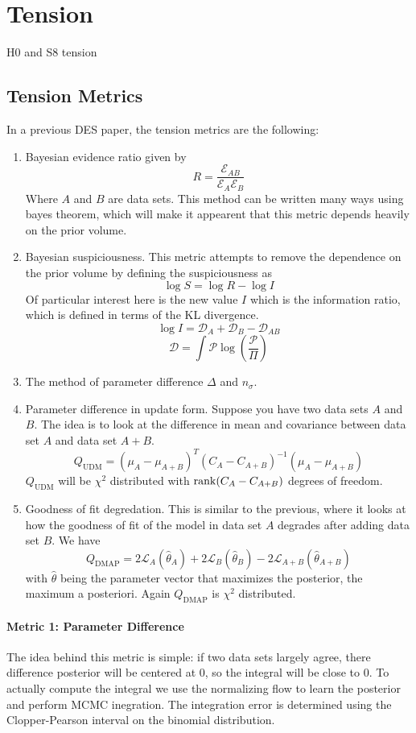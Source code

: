 \chapter{Tension}
H0 and S8 tension
\section{Tension Metrics}

In a previous DES paper, the tension metrics are the following:
\begin{enumerate}
    \item Bayesian evidence ratio given by
	\[ R = \frac{\mathcal{E}_{AB}}{\mathcal{E}_A\mathcal{E}_B} \]
	Where $A$ and $B$ are data sets. This method can be written many ways using bayes theorem, which will make it appearent that this metric depends heavily on the prior volume.
    \item Bayesian suspiciousness. This metric attempts to remove the dependence on the prior volume by defining the suspiciousness as 
	\[ \log S = \log R - \log I \]
	Of particular interest here is the new value $I$ which is the information ratio, which is defined in terms of the KL divergence.
	\[ \log I = \mathcal{D}_A + \mathcal{D}_B - \mathcal{D}_{AB} \]
	\[ \mathcal{D} = \int \mathcal{P} \log(\frac{\mathcal{P}}{\Pi}) \]
    \item The method of parameter difference $\Delta$ and $n_\sigma$.
    \item Parameter difference in update form. Suppose you have two data sets $A$ and $B$. The idea is to look at the difference in mean and covariance between data set $A$ and data set $A+B$.
	\[Q_{\mathrm{UDM}} = {(\mu_A - \mu_{A+B})}^T{(C_A-C_{A+B})}^{-1}(\mu_A - \mu_{A+B}) \]
	$Q_{\mathrm{UDM}}$ will be $\chi^2$ distributed with $\rank(C_A-C_{A+B})$ degrees of freedom.
    \item Goodness of fit degredation. This is similar to the previous, where it looks at how the goodness of fit of the model in data set $A$ degrades after adding data set $B$. We have
	\[ Q_{\mathrm{DMAP}} = 2\mathcal{L}_{A}(\hat{\theta}_A) + 2\mathcal{L}_B(\hat\theta_B) - 2 \mathcal{L}_{A+B}(\hat\theta_{A+B}) \]
	with $\hat{\theta}$ being the parameter vector that maximizes the posterior, the maximum a posteriori. Again $Q_{\mathrm{DMAP}}$ is $\chi^2$ distributed. 
\end{enumerate}

\subsubsection{Metric 1: Parameter Difference}
The idea behind this metric is simple: if two data sets largely agree, there difference posterior will be centered at 0, so the integral will be close to 0.
To actually compute the integral we use the normalizing flow to learn the posterior and perform MCMC inegration. The integration error is determined using the Clopper-Pearson interval on the binomial distribution.

